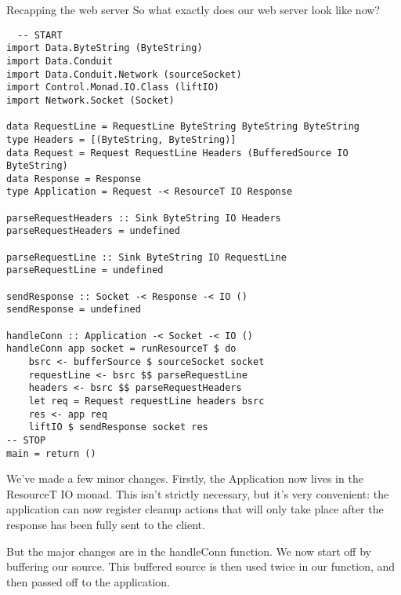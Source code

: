 Recapping the web server
So what exactly does our web server look like now?
\begin{lstlisting}
  -- START
import Data.ByteString (ByteString)
import Data.Conduit
import Data.Conduit.Network (sourceSocket)
import Control.Monad.IO.Class (liftIO)
import Network.Socket (Socket)

data RequestLine = RequestLine ByteString ByteString ByteString
type Headers = [(ByteString, ByteString)]
data Request = Request RequestLine Headers (BufferedSource IO ByteString)
data Response = Response
type Application = Request -< ResourceT IO Response

parseRequestHeaders :: Sink ByteString IO Headers
parseRequestHeaders = undefined

parseRequestLine :: Sink ByteString IO RequestLine
parseRequestLine = undefined

sendResponse :: Socket -< Response -< IO ()
sendResponse = undefined

handleConn :: Application -< Socket -< IO ()
handleConn app socket = runResourceT $ do
    bsrc <- bufferSource $ sourceSocket socket
    requestLine <- bsrc $$ parseRequestLine
    headers <- bsrc $$ parseRequestHeaders
    let req = Request requestLine headers bsrc
    res <- app req
    liftIO $ sendResponse socket res
-- STOP
main = return ()
\end{lstlisting}
We've made a few minor changes. Firstly, the Application now lives in the
ResourceT IO monad. This isn't strictly necessary, but it's very convenient:
the application can now register cleanup actions that will only take place after the
response has
been fully sent to the client.

But the major changes are in the handleConn function. We now start off by
buffering our source. This buffered source is then used twice in our function, and then
passed
off to the application.



